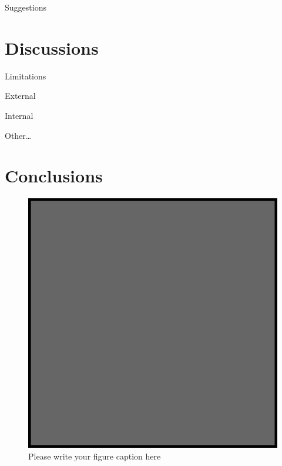 Suggestions



\section{Discussions}
\label{sec:1}

Limitations

External 

Internal

Other…




\section{Conclusions}
\label{sec:1}




\begin{figure}
  \includegraphics{example.eps}
\caption{Please write your figure caption here}
\label{fig:1}       %
\end{figure}
%
